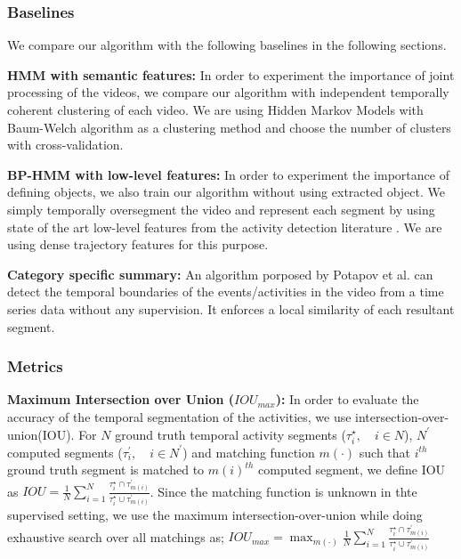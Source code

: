 \subsubsection{Baselines}
We compare our algorithm with the following baselines in the following sections.

\noindent\textbf{HMM with semantic features:}
In order to experiment the importance of joint processing of the videos, we compare our algorithm with independent temporally coherent clustering of each video. We are using Hidden Markov Models with Baum-Welch algorithm\cite{rabiner} as a clustering method and choose the number of clusters with cross-validation.

\noindent\textbf{BP-HMM with low-level features:}
In order to experiment the importance of defining objects, we also train our algorithm without using extracted object. We simply temporally oversegment the video and represent each segment by using state of the art low-level features from the activity detection literature \cite{acticityFeature}. We are using dense trajectory features for this purpose.

\noindent\textbf{Category specific summary\cite{potapov2014category}:}
An algorithm porposed by Potapov et al.\cite{potapov2014category} can detect the temporal boundaries of the events/activities in the video from a time series data without any supervision. It enforces a local similarity of each resultant segment.

\subsubsection{Metrics}
\noindent\textbf{Maximum Intersection over Union ($IOU_{max}$):}
In order to evaluate the accuracy of the temporal segmentation of the activities, we use intersection-over-union(IOU). For $N$ ground truth temporal activity segments ($\tau^\star_{i},\quad i\in N$), $N^\prime$ computed segments ($\tau^\prime_{i},\quad i\in N^\prime$) and matching function $m(\cdot)$ such that $i^{th}$ ground truth segment is matched to $m(i)^{th}$ computed segment, we define IOU as \mbox{$IOU=\frac{1}{N}\sum_{i=1}^N \frac{\tau^\star_i \cap \tau^\prime_{m(i)}}{\tau^\star_i \cup \tau^\prime_{m(i)}}$}. Since the matching function is unknown in thte supervised setting, we use the maximum intersection-over-union while doing exhaustive search over all matchings as;
\mbox{$IOU_{max} = \max_{m(\cdot)} \frac{1}{N}\sum_{i=1}^N \frac{\tau^\star_i \cap \tau^\prime_{m(i)}}{\tau^\star_i \cup \tau^\prime_{m(i)}}$}

